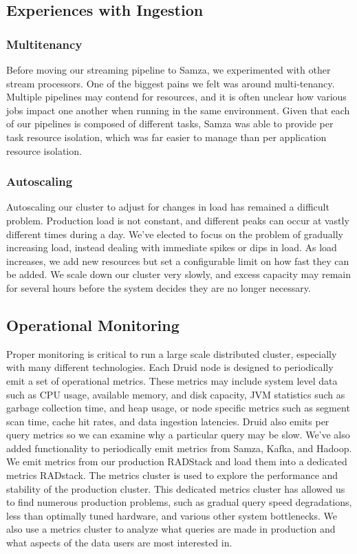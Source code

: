 \documentclass{vldb}
\begin{document}
{\subsection{Experiences with Ingestion}
\subsubsection{Multitenancy}
Before moving our streaming pipeline to Samza, we experimented with other
stream processors. One of the biggest pains we felt was around multi-tenancy. Multiple
pipelines may contend for resources, and it is often unclear how various jobs
impact one another when running in the same environment. Given that each of our
pipelines is composed of different tasks, Samza was able to provide per task
resource isolation, which was far easier to manage than per application
resource isolation.

\subsubsection{Autoscaling}
Autoscaling our cluster to adjust for changes in load has remained a difficult
problem. Production load is not constant, and different peaks can occur at
vastly different times during a day. We’ve elected to focus on the problem of
gradually increasing load, instead dealing with immediate spikes or dips in
load. As load increases, we add new resources but set a configurable limit on
how fast they can be added. We scale down our cluster very slowly, and excess
capacity may remain for several hours before the system decides they are no
longer necessary.

\subsection{Operational Monitoring}
Proper monitoring is critical to run a large scale distributed cluster,
especially with many different technologies. Each Druid node is designed to
periodically emit a set of operational metrics. These metrics may include
system level data such as CPU usage, available memory, and disk capacity, JVM
statistics such as garbage collection time, and heap usage, or node specific
metrics such as segment scan time, cache hit rates, and data ingestion
latencies. Druid also emits per query metrics so we can examine why a
particular query may be slow. We’ve also added functionality to periodically
emit metrics from Samza, Kafka, and Hadoop. We emit metrics from our production
RADStack and load them into a dedicated metrics RADstack. The metrics cluster
is used to explore the performance and stability of the production cluster.
This dedicated metrics cluster has allowed us to find numerous production
problems, such as gradual query speed degradations, less than optimally tuned
hardware, and various other system bottlenecks. We also use a metrics cluster
to analyze what queries are made in production and what aspects of the data
users are most interested in.

}
\end{document}
